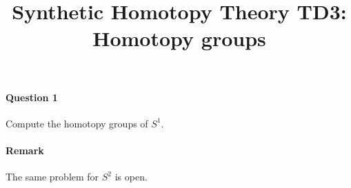 \documentclass{article}[6pt]%
\title{Synthetic Homotopy Theory TD3: \\ Homotopy groups}
\begin{document}
\maketitle


\begin{Exercise}[title={The homotopy groups of $S^1$}]


\paragraph{Question 1} Compute the homotopy groups of $S^1$. 

\paragraph{Remark} The same problem for $S^2$ is open.
\end{Exercise}
\end{document}

